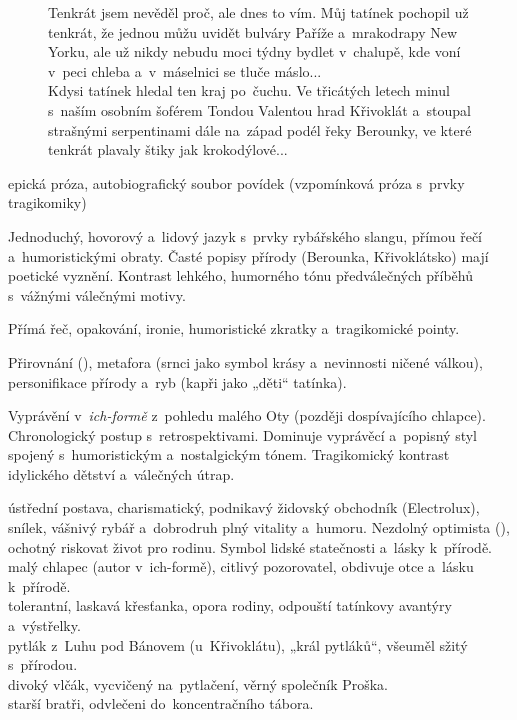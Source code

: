\documentclass[FGBook.tex]{subfiles}
\begin{document}

\noindent\begin{figure}\footnotesize
{}
\setlength{\parindent}{3pt}
Tenkrát jsem nevěděl proč, ale dnes to vím. Můj tatínek pochopil už tenkrát, že jednou můžu uvidět bulváry Paříže a~mrakodrapy New Yorku, ale už nikdy nebudu moci týdny bydlet v~chalupě, kde voní v~peci chleba a~v~máselnici se tluče máslo...\\
Kdysi tatínek hledal ten kraj po~čuchu. Ve třicátých letech minul s~naším osobním šoférem Tondou Valentou hrad Křivoklát a~stoupal strašnými serpentinami dále na~západ podél řeky Berounky, ve které tenkrát plavaly štiky jak krokodýlové...
\end{figure}


\noindent epická próza, autobiografický soubor povídek (vzpomínková próza s~prvky tragikomiky)

\noindent Jednoduchý, hovorový a~lidový jazyk s~prvky rybářského slangu, přímou řečí a~humoristickými obraty. Časté popisy přírody (Berounka, Křivoklátsko) mají poetické vyznění. Kontrast lehkého, humorného tónu předválečných příběhů s~vážnými válečnými motivy.

\noindent Přímá řeč, opakování, ironie, humoristické zkratky a~tragikomické pointy.

\noindent Přirovnání (), metafora (srnci jako symbol krásy a~nevinnosti ničené válkou), personifikace přírody a~ryb (kapři jako „děti“ tatínka).

\noindent Vyprávění v~\textit{ich-formě} z~pohledu malého Oty (později dospívajícího chlapce). Chronologický postup s~retrospektivami. Dominuje vyprávěcí a~popisný styl spojený s~humoristickým a~nostalgickým tónem. Tragikomický kontrast idylického dětství a~válečných útrap.

\noindent 
{} ústřední postava, charismatický, podnikavý židovský obchodník (Electrolux), snílek, vášnivý rybář a~dobrodruh plný vitality a~humoru. Nezdolný optimista (), ochotný riskovat život pro rodinu. Symbol lidské statečnosti a~lásky k~přírodě.\\
 malý chlapec (autor v~ich-formě), citlivý pozorovatel, obdivuje otce a~lásku k~přírodě.\\
 tolerantní, laskavá křesťanka, opora rodiny, odpouští tatínkovy avantýry a~výstřelky.\\
 pytlák z~Luhu pod Bánovem (u~Křivoklátu), „král pytláků“, všeuměl sžitý s~přírodou.\\
 divoký vlčák, vycvičený na~pytlačení, věrný společník Proška.\\
 starší bratři, odvlečeni do~koncentračního tábora.
\end{document}
